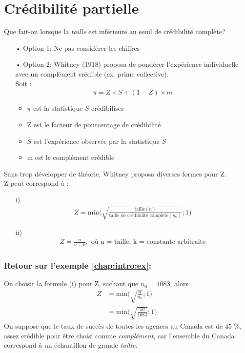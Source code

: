 \section{Crédibilité partielle}
Que fait-on lorsque la \textit{taille} est inférieure au seuil de crédibilité complète?
\begin{itemize}
\item[• Option 1: ]Ne pas considérer les chiffres
\item[• Option 2: ]Whitney (1918) proposa de pondérer l'expérience individuelle avec un complément crédible (ex. prime collective). 
\\
Soit :
\begin{equation}
\label{eq:crédipartie}
\pi = Z \times  \overline{S} + (1 - Z) \times  m
\end{equation}
	\begin{itemize}
	\item $\pi$  est la statistique $S$ crédibiliser
	\item Z est le facteur de pourcentage de crédibilité
	\item $\overline{S}$ est l'expérience observée par la statistique \textit{S}
	\item m est le complément crédible
	\end{itemize}
\end{itemize}
Sans trop développer de théorie, Whitney proposa diverses formes pour Z. 
\\

Z peut correspond à :
\begin{itemize}
\item[i)]
	\begin{align*}
	Z = \text{min} \Bigg( \sqrt{\frac{\text{taille}(n)}{\text{taille de crédibilité complète}(n_0)}} ; 1 \Bigg)
	\end{align*}
\item[ii)]
	\begin{align*}
	Z = \frac{n}{n + k}, \text{ où n = taille, k = constante arbitraite}
	\end{align*}
\end{itemize}
\subsubsection*{Retour sur l'exemple \ref{chap:intro:ex}:}
On choisit la formule (i) pour Z, sachant que $n_0 = 1083$, alors
\begin{align*}
Z &= \text{min} \Bigg( \sqrt{\frac{n}{n_0}} ; 1 \Bigg)\\
&=\text{min} \Bigg( \sqrt{\frac{50}{1083}} ; 1 \Bigg)
\end{align*} 
On suppose que le taux de succès de toutes les agences au Canada est de 45 \%, assez crédible pour être choisi comme \textit{complément}, car l'ensemble du Canada correspond à un échantillon de grande \textit{taille}.

